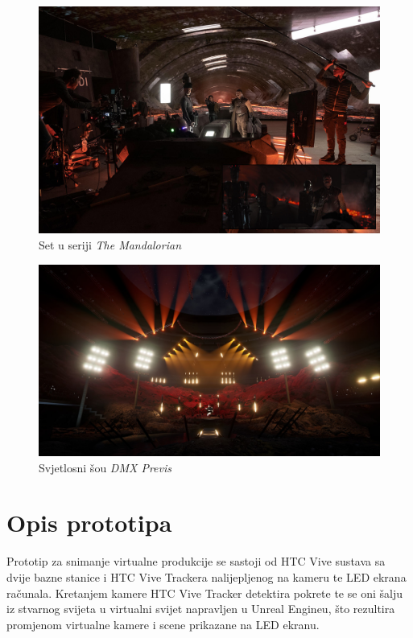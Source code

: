 \documentclass[times, utf8, zavrsni, numeric]{fer}
\begin{document}
\begin{figure}[htp]
	\centering
	\includegraphics[width=\linewidth]{slika 2-3.png}
	\caption{Set u seriji \emph{The Mandalorian} \cite{mandalorian}}
	\label{fig:slika 2-3}
\end{figure}

\begin{figure}[htp]
	\centering
	\includegraphics[width=\linewidth]{slika 2-4.png}
	\caption{Svjetlosni šou \emph{DMX Previs} \cite{dmx_previs}}
	\label{fig:slika 2-4}
\end{figure}

\pagebreak

\section{Opis prototipa}
Prototip za snimanje virtualne produkcije se sastoji od HTC Vive sustava sa dvije bazne stanice i HTC Vive Trackera nalijepljenog na kameru te LED ekrana računala. Kretanjem kamere HTC Vive Tracker detektira pokrete te se oni šalju iz stvarnog svijeta u virtualni svijet napravljen u Unreal Engineu, što rezultira promjenom virtualne kamere i scene prikazane na LED ekranu.\newline
\end{document}
